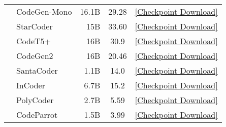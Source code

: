 \begin{table}[t!]
{{\begin{tabular}{clrcc}
        & CodeGen-Mono \cite{nijkamp2022codegen} & 16.1B & 29.28           & \href{https://huggingface.co/Salesforce/codegen-16B-mono}{[Checkpoint Download]}  \\
        & StarCoder \cite{li2023starcoder} & 15B & 33.60     & \href{https://huggingface.co/bigcode/starcoder}{[Checkpoint Download]}  \\
        & CodeT5+ \cite{wang2021codet5} & 16B & 30.9    & \href{https://huggingface.co/Salesforce/codet5p-16b}{[Checkpoint Download]}  \\
        & CodeGen2 \cite{nijkamp2023codegen2} & 16B & 20.46       & \href{https://huggingface.co/Salesforce/codegen2-16B_P}{[Checkpoint Download]}  \\
         & SantaCoder \cite{allal2023santacoder} & 1.1B & 14.0        & \href{https://huggingface.co/bigcode/santacoder}{[Checkpoint Download]}  \\
         & InCoder \cite{fried2022incoder} & 6.7B & 15.2     & \href{https://huggingface.co/facebook/incoder-6B}{[Checkpoint Download]}  \\
         & PolyCoder \cite{xu2022systematic} & 2.7B & 5.59   & \href{https://huggingface.co/NinedayWang/PolyCoder-2.7B}{[Checkpoint Download]}  \\
         & CodeParrot \cite{tunstall2022natural} & 1.5B & 3.99   & \href{https://huggingface.co/codeparrot/codeparrot}{[Checkpoint Download]} \\  
    \bottomrule
    \end{tabular}
}
}
\vspace{-10pt}
\end{table}